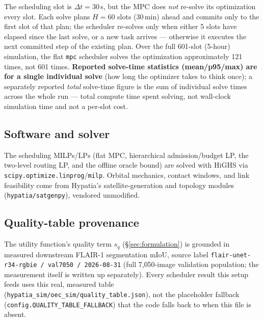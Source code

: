 The scheduling slot is $\Delta t = 30$\,s, but the MPC does \emph{not}
re-solve its optimization every slot. Each solve plans $H=60$ slots (30\,min)
ahead and commits only to the first slot of that plan; the scheduler
re-solves only when either 5 slots have elapsed since the last solve, or a
new task arrives — otherwise it executes the next committed step of the
existing plan. Over the full 601-slot (5-hour) simulation, the flat
\texttt{mpc} scheduler solves the optimization approximately 121 times, not
601 times. \textbf{Reported solve-time statistics (mean/p95/max) are for a
single individual solve} (how long the optimizer takes to think once); a
separately reported \emph{total} solve-time figure is the sum of individual
solve times across the whole run — total compute time spent solving, not
wall-clock simulation time and not a per-slot cost.

\subsection{Software and solver}

The scheduling MILPs/LPs (flat MPC, hierarchical admission/budget LP, the
two-level routing LP, and the offline oracle bound) are solved with HiGHS via
\texttt{scipy.optimize.linprog}/\texttt{milp}. Orbital mechanics, contact
windows, and link feasibility come from Hypatia's satellite-generation and
topology modules (\texttt{hypatia/satgenpy}), vendored unmodified.

\subsection{Quality-table provenance}

The utility function's quality term $s_q$ (\S\ref{sec:formulation}) is
grounded in measured downstream FLAIR-1 segmentation mIoU, source label
\texttt{flair-unet-r34-rgbie / val7050 / 2026-08-31} (full 7{,}050-image
validation population; the measurement itself is written up separately).
Every scheduler result this setup feeds uses this real, measured table
(\texttt{hypatia\_sim/oec\_sim/quality\_table.json}), not the placeholder
fallback (\texttt{config.QUALITY\_TABLE\_FALLBACK}) that the code falls
back to when this file is absent.
